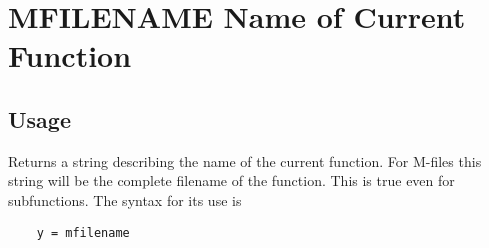 \section{MFILENAME Name of Current Function}

\subsection{Usage}

Returns a string describing the name of the current function.  For M-files
this string will be the complete filename of the function.  This is true even
for subfunctions.  The syntax for its use is
\begin{verbatim}
    y = mfilename
\end{verbatim}

